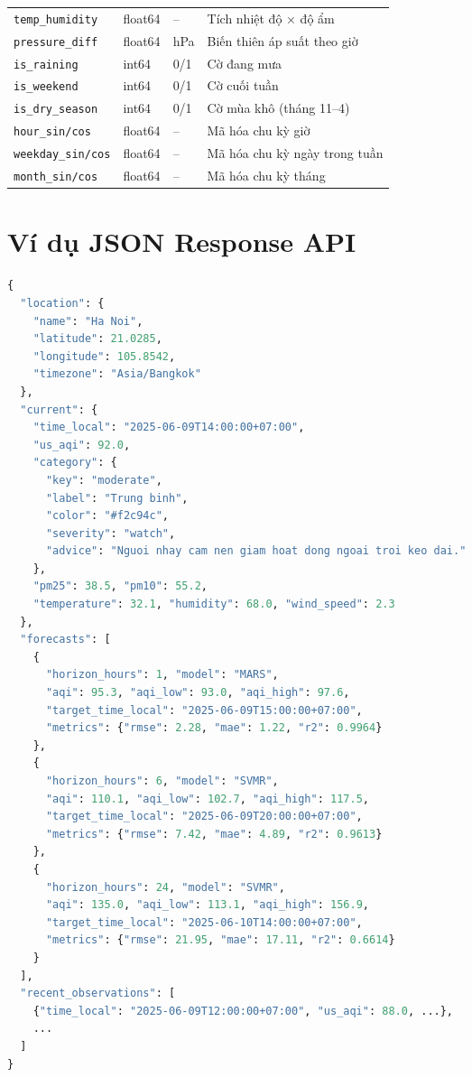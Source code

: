 \documentclass[12pt,a4paper]{report}
\begin{document}
\begin{table}[H]
\begin{tabular}{llll}
\texttt{temp\_humidity}     & float64    & --     & Tích nhiệt độ × độ ẩm \\
\texttt{pressure\_diff}     & float64    & hPa    & Biến thiên áp suất theo giờ \\
\texttt{is\_raining}        & int64      & 0/1    & Cờ đang mưa \\
\texttt{is\_weekend}        & int64      & 0/1    & Cờ cuối tuần \\
\texttt{is\_dry\_season}    & int64      & 0/1    & Cờ mùa khô (tháng 11--4) \\
\texttt{hour\_sin/cos}      & float64    & --     & Mã hóa chu kỳ giờ \\
\texttt{weekday\_sin/cos}   & float64    & --     & Mã hóa chu kỳ ngày trong tuần \\
\texttt{month\_sin/cos}     & float64    & --     & Mã hóa chu kỳ tháng \\
\bottomrule
\end{tabular}
\end{table}

\chapter{Ví dụ JSON Response API}

\begin{lstlisting}[language=Python, caption={Mẫu JSON response GET /api/forecast}]
{
  "location": {
    "name": "Ha Noi",
    "latitude": 21.0285,
    "longitude": 105.8542,
    "timezone": "Asia/Bangkok"
  },
  "current": {
    "time_local": "2025-06-09T14:00:00+07:00",
    "us_aqi": 92.0,
    "category": {
      "key": "moderate",
      "label": "Trung binh",
      "color": "#f2c94c",
      "severity": "watch",
      "advice": "Nguoi nhay cam nen giam hoat dong ngoai troi keo dai."
    },
    "pm25": 38.5, "pm10": 55.2,
    "temperature": 32.1, "humidity": 68.0, "wind_speed": 2.3
  },
  "forecasts": [
    {
      "horizon_hours": 1, "model": "MARS",
      "aqi": 95.3, "aqi_low": 93.0, "aqi_high": 97.6,
      "target_time_local": "2025-06-09T15:00:00+07:00",
      "metrics": {"rmse": 2.28, "mae": 1.22, "r2": 0.9964}
    },
    {
      "horizon_hours": 6, "model": "SVMR",
      "aqi": 110.1, "aqi_low": 102.7, "aqi_high": 117.5,
      "target_time_local": "2025-06-09T20:00:00+07:00",
      "metrics": {"rmse": 7.42, "mae": 4.89, "r2": 0.9613}
    },
    {
      "horizon_hours": 24, "model": "SVMR",
      "aqi": 135.0, "aqi_low": 113.1, "aqi_high": 156.9,
      "target_time_local": "2025-06-10T14:00:00+07:00",
      "metrics": {"rmse": 21.95, "mae": 17.11, "r2": 0.6614}
    }
  ],
  "recent_observations": [
    {"time_local": "2025-06-09T12:00:00+07:00", "us_aqi": 88.0, ...},
    ...
  ]
}
\end{lstlisting}
\end{document}
